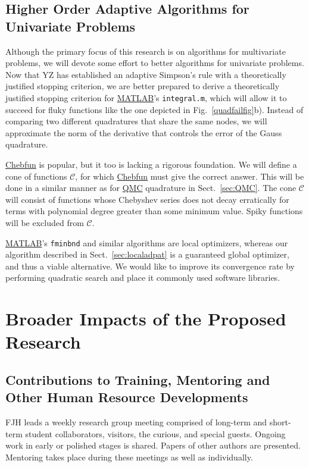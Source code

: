 \documentclass[11pt]{NSFamsart}
\newcommand{\QMC}{\hyperlink{QMClink}{QMC}\xspace}
\newcommand{\MATLAB}{\hyperlink{MATLABlink}{MATLAB}\xspace}
\newcommand{\Chebfun}{\hyperlink{Chebfunlink}{Chebfun}\xspace}
\newcommand{\cc}{\mathcal{C}}
\begin{document}
\subsection{Higher Order Adaptive Algorithms for Univariate Problems}\label{SectUniProb}

Although the primary focus of this research is on algorithms for multivariate problems, we will devote some effort to better algorithms for univariate problems.  Now that YZ has established an adaptive Simpson's rule with a theoretically justified stopping criterion, we are better prepared to derive a theoretically justified stopping criterion for \MATLAB's 
\texttt{integral.m}, which will allow it to succeed for fluky functions like the one depicted in Fig.\ \ref{quadfailfig}b).  Instead of comparing two different quadratures that share the same nodes, we will approximate the norm of the derivative that controls the error of the Gauss quadrature.

\Chebfun is popular, but it too is lacking a rigorous foundation.  We will define a cone of functions
$\cc$, for which \Chebfun must give the correct answer.  This will be done in a similar manner as for \QMC quadrature in Sect.\ \ref{sec:QMC}.  The cone $\cc$ will consist of functions 
whose Chebyshev series does not decay erratically for terms with polynomial degree greater than 
some minimum value.  Spiky functions will be excluded from $\cc$.

\MATLAB's \texttt{fminbnd} and similar algorithms are local optimizers, whereas our algorithm described in Sect.\ \ref{sec:localadpat} is a guaranteed global optimizer, and thus a viable alternative.  We would like to improve its convergence rate by performing quadratic search and place it commonly used software libraries.

\section{Broader Impacts of the Proposed Research}\label{SectBroad}


\subsection{Contributions to Training, Mentoring and Other Human Resource Developments}
FJH leads a weekly research group meeting comprised of long-term and short-term student 
collaborators, visitors, the curious, and special guests.  Ongoing work in early or polished stages is shared.  Papers of other authors are presented.  Mentoring takes place during these meetings as well as individually.
\end{document}
